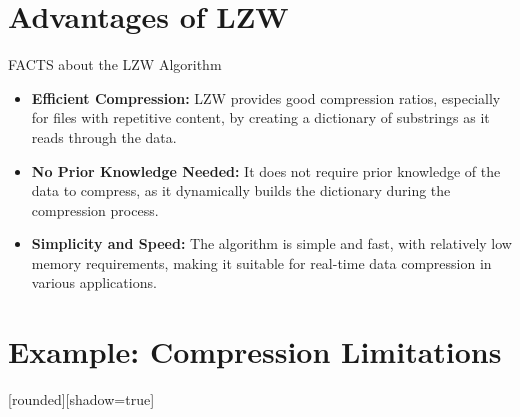 \documentclass{beamer}
\begin{document}
\section{Advantages of LZW}

\begin{frame}{FACTS about the LZW Algorithm}
    \begin{itemize}
        \item<1-> \textcolor{TextTeal}{\textbf{Efficient Compression:}} LZW provides good compression ratios, especially for files with repetitive content, by creating a dictionary of substrings as it reads through the data.
        \item<2-> \textcolor{TextTeal}{\textbf{No Prior Knowledge Needed:}} It does not require prior knowledge of the data to compress, as it dynamically builds the dictionary during the compression process.
        \item<3-> \textcolor{TextTeal}{\textbf{Simplicity and Speed:}} The algorithm is simple and fast, with relatively low memory requirements, making it suitable for real-time data compression in various applications.
    \end{itemize}
\end{frame}



\section{Example: Compression Limitations}


[rounded][shadow=true]
\end{document}
